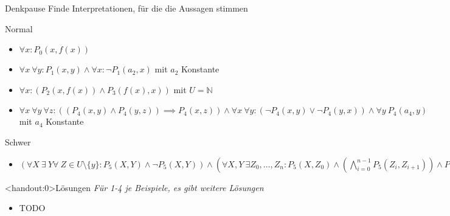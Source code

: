 {
\begin{frame}{Denkpause}
    Finde Interpretationen, für die die Aussagen stimmen
    \begin{block}{Normal}
        \begin{itemize}
            \item $\forall x: {P_0(x,f(x))}$
            \item $\forall x\ \forall y : P_1(x,y)\land \forall x : \lnot P_1(a_2,x)$ mit $a_2$ Konstante
            \item $\forall x : \left(P_2(x,f(x))\land P_3(f(x),x)\right)$ mit $U=\mathbb{N}$ %
            \item $\forall x\ \forall y\ \forall z : \left(\left(P_4(x,y) \land P_4(y,z)\right)\implies P_4(x,z)\right) \land \forall x\ \forall y : \left(\lnot P_4(x,y) \lor \lnot P_4(y,x)\right) \land \forall y\ P_4(a_4, y)$ mit $a_4$ Konstante
        \end{itemize}
    \end{block}
    \begin{block}{Schwer}
        \begin{itemize}
            \item $\left(\forall X\ \exists\ Y \forall\ Z \in U\setminus\{y\} : P_5(X,Y)\land\lnot P_5(X,Y)\right) \land \left(\forall X,Y\ \exists Z_0,\dots,Z_n : P_5(X,Z_0) \land \left(\bigwedge_{i=0}^{n-1} P_5(Z_i,Z_{i+1})\right) \land P_5(Z_n,Y)\right)$
        \end{itemize}
    \end{block}
\end{frame}

\begin{frame}<handout:0>{Lösungen}
    \textit{Für 1-4 je Beispiele, es gibt weitere Lösungen}
    \begin{itemize}[<+- | alert@+>]
        \item TODO
    \end{itemize}

\end{frame}

}
